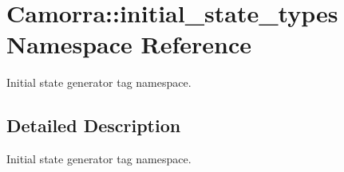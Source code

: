 \hypertarget{a00806}{
\section{Camorra::initial\_\-state\_\-types Namespace Reference}
\label{a00806}
}


Initial state generator tag namespace.  




\subsection{Detailed Description}
Initial state generator tag namespace. 